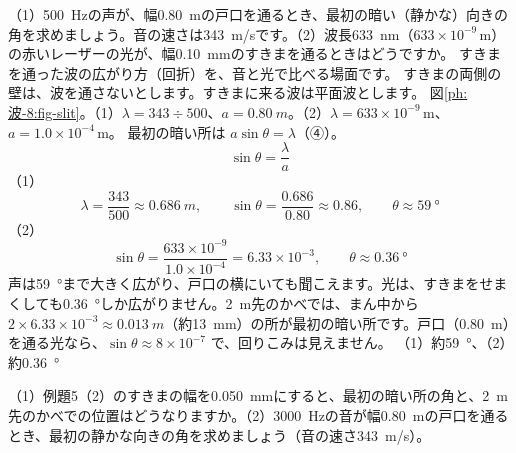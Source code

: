 \label{ph:波-8:ex5}
\begin{phreidai}
（1）\qty{500}{Hz}の声が、幅\qty{0.80}{m}の戸口を通るとき、最初の暗い（静かな）向きの角を求めましょう。音の速さは\qty{343}{m/s}です。（2）波長\qty{633}{nm}（$633\times10^{-9}$\,m）の赤いレーザーの光が、幅\qty{0.10}{mm}のすきまを通るときはどうですか。
\phbamen
すきまを通った波の広がり方（回折）を、音と光で比べる場面です。
\phmushi
すきまの両側の壁は、波を通さないとします。すきまに来る波は平面波とします。
\phzu
図\ref{ph:波-8:fig-slit}。（1）$\lambda=343\div500$、$a=\qty{0.80}{m}$。（2）$\lambda=633\times10^{-9}$\,m、$a=1.0\times10^{-4}$\,m。
\phriyu
最初の暗い所は $a\sin\theta=\lambda$（④）。
\phtateru
\[\sin\theta=\frac{\lambda}{a}\]
\phtoku
（1）\[\lambda=\frac{343}{500}\approx\qty{0.686}{m},\qquad\sin\theta=\frac{0.686}{0.80}\approx0.86,\qquad\theta\approx\qty{59}{\degree}\]
（2）\[\sin\theta=\frac{633\times10^{-9}}{1.0\times10^{-4}}=6.33\times10^{-3},\qquad\theta\approx\qty{0.36}{\degree}\]
\phtashikame
声は\qty{59}{\degree}まで大きく広がり、戸口の横にいても聞こえます。光は、すきまをせまくしても\qty{0.36}{\degree}しか広がりません。\qty{2}{m}先のかべでは、まん中から $2\times6.33\times10^{-3}\approx\qty{0.013}{m}$（約\qty{13}{mm}）の所が最初の暗い所です。戸口（\qty{0.80}{m}）を通る光なら、$\sin\theta\approx8\times10^{-7}$ で、回りこみは見えません。
\kotae （1）約\qty{59}{\degree}、（2）約\qty{0.36}{\degree}
\end{phreidai}
\begin{jibun}
（1）例題5（2）のすきまの幅を\qty{0.050}{mm}にすると、最初の暗い所の角と、\qty{2}{m}先のかべでの位置はどうなりますか。（2）\qty{3000}{Hz}の音が幅\qty{0.80}{m}の戸口を通るとき、最初の静かな向きの角を求めましょう（音の速さ\qty{343}{m/s}）。
\end{jibun}

